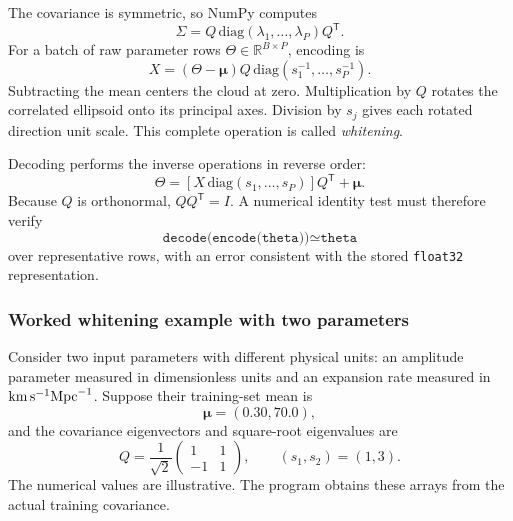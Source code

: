 \documentclass[10pt,aps,prd,twocolumn,nofootinbib]{revtex4-2}
\newcommand{\code}[1]{\texttt{#1}}
\begin{document}
The covariance is symmetric, so NumPy computes
\begin{equation}
  \Sigma = Q\,\mathrm{diag}(\lambda_1,\ldots,\lambda_P)Q^{\mathsf T}.
\end{equation}
For a batch of raw parameter rows $\Theta\in\mathbb{R}^{B\times P}$,
encoding is
\begin{equation}
  X = (\Theta-\boldsymbol\mu)Q\,\mathrm{diag}(s_1^{-1},\ldots,s_P^{-1}).
  \label{eq:param-encode}
\end{equation}
Subtracting the mean centers the cloud at zero.  Multiplication by $Q$ rotates
the correlated ellipsoid onto its principal axes.  Division by $s_j$ gives
each rotated direction unit scale.  This complete operation is called
\emph{whitening}.

Decoding performs the inverse operations in reverse order:
\begin{equation}
  \Theta =
  \left[X\,\mathrm{diag}(s_1,\ldots,s_P)\right]Q^{\mathsf T}
  +\boldsymbol\mu.
  \label{eq:param-decode}
\end{equation}
Because $Q$ is orthonormal, $Q Q^{\mathsf T}=I$.  A numerical identity test
must therefore verify
\begin{equation}
  \code{decode(encode(theta))}\simeq\code{theta}
\end{equation}
over representative rows, with an error consistent with the stored
\code{float32} representation.

\subsubsection{Worked whitening example with two parameters}

Consider two input parameters with different physical units: an amplitude
parameter measured in dimensionless units and an expansion rate measured in
${\rm km}\,{\rm s}^{-1}{\rm Mpc}^{-1}$.  Suppose their training-set mean is
\begin{equation*}
  \boldsymbol\mu=(0.30,70.0),
\end{equation*}
and the covariance eigenvectors and square-root eigenvalues are
\begin{equation*}
 Q=\frac{1}{\sqrt{2}}
 \begin{pmatrix}1&1\\-1&1\end{pmatrix},
 \qquad
 (s_1,s_2)=(1,3).
\end{equation*}
The numerical values are illustrative.  The program obtains these arrays from
the actual training covariance.
\end{document}

